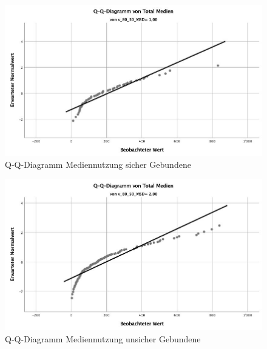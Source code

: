 \begin{figure}[h]
  \centering
     \includegraphics[scale=0.4]{content/Grafik/QQDiagramm_TotalMedien_SicherGebunden.jpg}
  \captionsetup{margin=80pt}     
  \caption{Q-Q-Diagramm Mediennutzung sicher Gebundene}
  \label{fig:AppQQDiagrammSicherGebunden}
\end{figure}
\begin{figure}[h]
  \centering
     \includegraphics[scale=0.4]{content/Grafik/QQDiagramm_TotalMedien_UnsicherGebunden.jpg}
  \captionsetup{margin=80pt}
  \caption{Q-Q-Diagramm Mediennutzung unsicher Gebundene}
  \label{fig:AppQQDiagrammUnsicherGebunden}
\end{figure}